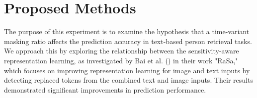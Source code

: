 \chapter{Proposed Methods}


The purpose of this experiment is to examine the hypothesis that a time-variant masking ratio affects the prediction accuracy in text-based person retrieval tasks. We approach this by exploring the relationship between the sensitivity-aware representation learning, as investigated by Bai et al. (\cite{Bai2023RaSaRA}) in their work "RaSa," which focuses on improving representation learning for image and text inputs by detecting replaced tokens from the combined text and image inputs. Their results demonstrated significant improvements in prediction performance.

